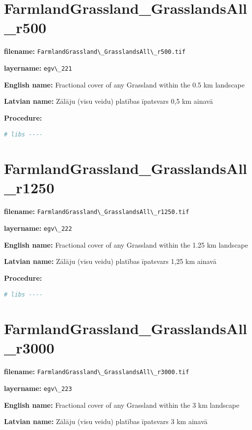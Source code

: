 \documentclass[
]{book}
\newcommand{\passthrough}[1]{#1}
\begin{document}
\section{FarmlandGrassland\_GrasslandsAll\_r500}\label{ch06.221}

\textbf{filename:} \passthrough{\lstinline!FarmlandGrassland\_GrasslandsAll\_r500.tif!}

\textbf{layername:} \passthrough{\lstinline!egv\_221!}

\textbf{English name:} Fractional cover of any Grassland within the 0.5 km landscape

\textbf{Latvian name:} Zālāju (visu veidu) platības īpatsvars 0,5 km ainavā

\textbf{Procedure:}

\begin{lstlisting}[language=R]
# libs ----
\end{lstlisting}

\section{FarmlandGrassland\_GrasslandsAll\_r1250}\label{ch06.222}

\textbf{filename:} \passthrough{\lstinline!FarmlandGrassland\_GrasslandsAll\_r1250.tif!}

\textbf{layername:} \passthrough{\lstinline!egv\_222!}

\textbf{English name:} Fractional cover of any Grassland within the 1.25 km landscape

\textbf{Latvian name:} Zālāju (visu veidu) platības īpatsvars 1,25 km ainavā

\textbf{Procedure:}

\begin{lstlisting}[language=R]
# libs ----
\end{lstlisting}

\section{FarmlandGrassland\_GrasslandsAll\_r3000}\label{ch06.223}

\textbf{filename:} \passthrough{\lstinline!FarmlandGrassland\_GrasslandsAll\_r3000.tif!}

\textbf{layername:} \passthrough{\lstinline!egv\_223!}

\textbf{English name:} Fractional cover of any Grassland within the 3 km landscape

\textbf{Latvian name:} Zālāju (visu veidu) platības īpatsvars 3 km ainavā
\end{document}
